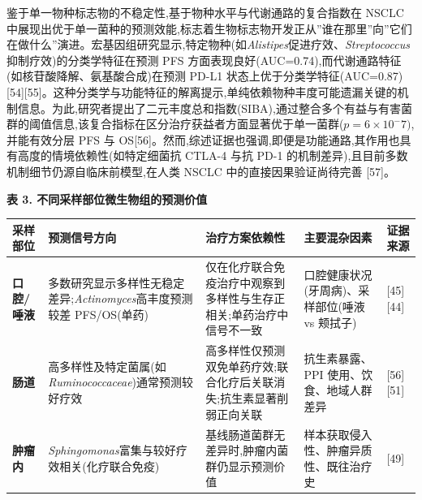 鉴于单一物种标志物的不稳定性,基于物种水平与代谢通路的复合指数在 NSCLC 中展现出优于单一菌种的预测效能,标志着生物标志物开发正从''谁在那里''向''它们在做什么''演进。宏基因组研究显示,特定物种(如\emph{Alistipes}促进疗效、\emph{Streptococcus}抑制疗效)的分类学特征在预测 PFS 方面表现良好(AUC=0.74),而代谢通路特征(如核苷酸降解、氨基酸合成)在预测 PD-L1 状态上优于分类学特征(AUC=0.87){[}54{]}{[}55{]}。这种分类学与功能特征的解离提示,单纯依赖物种丰度可能遗漏关键的机制信息。为此,研究者提出了二元丰度总和指数(SIBA),通过整合多个有益与有害菌群的阈值信息,该复合指标在区分治疗获益者方面显著优于单一菌群(\(p=6\times10^-7)\),并能有效分层 PFS 与 OS{[}56{]}。然而,综述证据也强调,即便是功能通路,其作用也具有高度的情境依赖性(如特定细菌抗 CTLA-4 与抗 PD-1 的机制差异),且目前多数机制细节仍源自临床前模型,在人类 NSCLC 中的直接因果验证尚待完善 {[}57{]}。

\textbf{表 3. 不同采样部位微生物组的预测价值}

{\def\LTcaptype{none} %
\begin{longtable}[]{@{}
  >{\raggedright\arraybackslash}p{}
  >{\raggedright\arraybackslash}p{}
  >{\raggedright\arraybackslash}p{}
  >{\raggedright\arraybackslash}p{}
  >{\raggedright\arraybackslash}p{}@{}}
\toprule\noalign{}
\begin{minipage}[b]{\linewidth}\raggedright
采样部位
\end{minipage} & \begin{minipage}[b]{\linewidth}\raggedright
预测信号方向
\end{minipage} & \begin{minipage}[b]{\linewidth}\raggedright
治疗方案依赖性
\end{minipage} & \begin{minipage}[b]{\linewidth}\raggedright
主要混杂因素
\end{minipage} & \begin{minipage}[b]{\linewidth}\raggedright
证据来源
\end{minipage} \\
\midrule\noalign{}
\endhead
\bottomrule\noalign{}
\endlastfoot
\textbf{口腔/唾液} & 多数研究显示多样性无稳定差异;\emph{Actinomyces}高丰度预测较差 PFS/OS(单药) & 仅在化疗联合免疫治疗中观察到多样性与生存正相关;单药治疗中信号不一致 & 口腔健康状况(牙周病)、采样部位(唾液 vs 颊拭子) & {[}45{]}{[}44{]} \\
\textbf{肠道} & 高多样性及特定菌属(如\emph{Ruminococcaceae})通常预测较好疗效 & 高多样性仅预测双免单药疗效;联合化疗后关联消失;抗生素显著削弱正向关联 & 抗生素暴露、PPI 使用、饮食、地域人群差异 & {[}56{]}{[}51{]} \\
\textbf{肿瘤内} & \emph{Sphingomonas}富集与较好疗效相关(化疗联合免疫) & 基线肠道菌群无差异时,肿瘤内菌群仍显示预测价值 & 样本获取侵入性、肿瘤异质性、既往治疗史 & {[}49{]} \\
\end{longtable}
}

